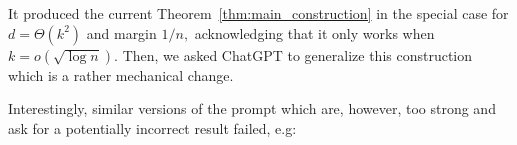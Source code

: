 \documentclass[preprint]{article}
\begin{document}
\begin{enumerate}
    \medskip
    
    
    It produced the current Theorem~\ref{thm:main_construction} in the special case for $d = \Theta(k^2)$ and margin $1/n,$ acknowledging that it only works when $k = o(\sqrt{\log n}).$ Then, we asked ChatGPT to generalize this construction which is a rather mechanical change. 
    
    Interestingly, similar versions of the prompt which are, however, too strong and ask for a potentially incorrect result failed, e.g:
        
    \medskip
    
\end{enumerate}



\newpage

% 
\end{document}

